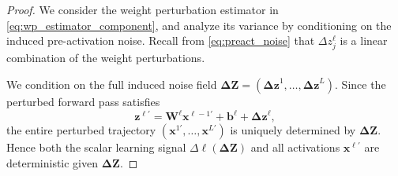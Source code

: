 \begin{proof}
We consider the weight perturbation estimator in \eqref{eq:wp_estimator_component}, and analyze its variance by conditioning on the induced pre-activation noise. Recall from \eqref{eq:preact_noise} that $\Delta z^\ell_j$ is a linear combination of the weight perturbations.

We condition on the full induced noise field \(\boldsymbol{\Delta Z}=(\boldsymbol{\Delta z}^1,\dots,\boldsymbol{\Delta z}^L)\). Since the perturbed forward pass satisfies
\[
\mathbf{z}^{\ell\prime}
=
\mathbf{W}^\ell \mathbf{x}^{\ell-1\prime}
+
\mathbf{b}^\ell
+
\boldsymbol{\Delta z}^\ell,
\]
the entire perturbed trajectory \((\mathbf{x}^{1\prime},\dots,\mathbf{x}^{L\prime})\) is uniquely determined by \(\boldsymbol{\Delta Z}\). Hence both the scalar learning signal \(\Delta \ell(\boldsymbol{\Delta Z})\) and all activations \(\mathbf{x}^{\ell\prime}\) are deterministic given \(\boldsymbol{\Delta Z}\).


\end{proof}
